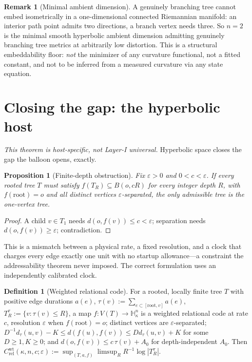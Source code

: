 \documentclass[11pt,reqno]{amsart}
\theoremstyle{plain}
\newtheorem{proposition}[theorem]{Proposition}
\theoremstyle{definition}
\newtheorem{definition}[theorem]{Definition}
\newtheorem{remark}[theorem]{Remark}
\newcommand{\Crel}{C_{\mathrm{rel}}}
\newcommand{\Hk}{\mathbb{H}^n_\kappa}
\newcommand{\eps}{\varepsilon}
\begin{document}
\begin{remark}[Minimal ambient dimension]\label{rem:floor}
A genuinely branching tree cannot embed isometrically in a one-dimensional connected Riemannian manifold: an interior path point admits two directions, a branch vertex needs three. So $n=2$ is the minimal smooth hyperbolic ambient dimension admitting genuinely branching tree metrics at arbitrarily low distortion. This is a structural embeddability floor: \emph{not} the minimizer of any curvature functional, not a fitted constant, and not to be inferred from a measured curvature via any state equation.
\end{remark}

\section{Closing the gap: the hyperbolic host}\label{sec:relational}

\emph{This theorem is host-specific, not Layer-I universal.} Hyperbolic space closes the gap the balloon opens, exactly.

\begin{proposition}[Finite-depth obstruction]\label{prop:finitedepth}
Fix $\eps>0$ and $0<c<\eps$. If every rooted tree $T$ must satisfy $f(T_R)\subseteq B(o,cR)$ for every integer depth $R$, with $f(\mathrm{root})=o$ and all distinct vertices $\eps$-separated, the only admissible tree is the one-vertex tree.
\end{proposition}

\begin{proof}
A child $v\in T_1$ needs $d(o,f(v))\le c<\eps$; separation needs $d(o,f(v))\ge\eps$; contradiction.
\end{proof}

This is a mismatch between a physical rate, a fixed resolution, and a clock that charges every edge exactly one unit with no startup allowance---a constraint the addressability theorem never imposed. The correct formulation uses an independently calibrated clock.

\begin{definition}[Weighted relational code]
For a rooted, locally finite tree $T$ with positive edge durations $a(e)$, $\tau(v):=\sum_{e\subset[\mathrm{root},v]}a(e)$, $T_R^\tau:=\{v:\tau(v)\le R\}$, a map $f:V(T)\to\Hk$ is a weighted relational code at rate $c$, resolution $\eps$ when $f(\mathrm{root})=o$; distinct vertices are $\eps$-separated; $D^{-1}d_\tau(u,v)-K\le d(f(u),f(v))\le Dd_\tau(u,v)+K$ for some $D\ge1,K\ge0$; and $d(o,f(v))\le c\,\tau(v)+A_0$ for depth-independent $A_0$. Then $\Crel^{\mathrm{wt}}(\kappa,n,c;\eps):=\sup_{(T,a,f)}\limsup_R R^{-1}\log|T_R^\tau|$.
\end{definition}
\end{document}
